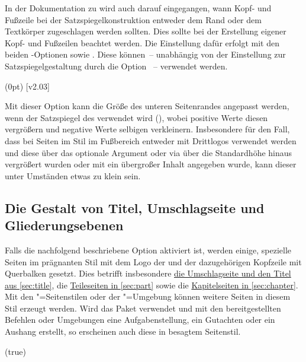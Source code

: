 \begin{DeclareEntity*}{}
\begin{DeclareEntity*}{}
\begin{DeclareEntity*}{}
In der Dokumentation zu  wird auch darauf eingegangen, wann 
Kopf- und Fußzeile bei der Satzspiegelkonstruktion entweder dem Rand oder dem 
Textkörper zugeschlagen werden sollten. Dies sollte bei der Erstellung eigener 
Kopf- und Fußzeilen beachtet werden. Die Einstellung dafür erfolgt mit den 
beiden \KOMAScript-Optionen 
 sowie 
. Diese 
können~-- unabhängig von der Einstellung zur Satzspiegelgestaltung durch die 
Option ~-- verwendet werden.
%

\begin{Declaration}
  {}
  (0pt)
  [v2.03]
\printdeclarationlist

Mit dieser Option kann die Größe des unteren Seitenrandes angepasst werden, 
wenn der Satzspiegel des \CDs verwendet wird (), 
wobei positive Werte diesen vergrößern und negative Werte selbigen verkleinern.
Insbesondere für den Fall, dass bei Seiten im Stil  
im Fußbereich entweder mit  Drittlogos verwendet werden und 
diese über das optionale Argument oder via  über die 
Standardhöhe hinaus vergrößert wurden oder mit  ein 
übergroßer Inhalt angegeben wurde, kann dieser unter Umständen etwas zu klein 
sein. 
\end{Declaration}



\subsection{%
  Die Gestalt von Titel, Umschlagseite und Gliederungsebenen%
}

Falls die nachfolgend beschriebene Option  aktiviert ist, 
werden einige, spezielle Seiten im prägnanten Stil mit dem Logo der \TnUD und 
der dazugehörigen Kopfzeile mit Querbalken gesetzt. Dies betrifft insbesondere 
\hyperref[sec:title]{die Umschlagseite und den Titel aus \autoref{sec:title}}, 
die \hyperref[sec:part]{Teileseiten in \autoref{sec:part}} sowie die
\hyperref[sec:chapter]{Kapitelseiten in \autoref{sec:chapter}}. Mit den 
"=Seitenstilen oder der "=Umgebung 
können weitere Seiten in diesem Stil erzeugt werden. Wird das Paket 
 verwendet und mit den bereitgestellten Befehlen oder 
Umgebungen eine Aufgabenstellung, ein Gutachten oder ein Aushang erstellt, so 
erscheinen auch diese in besagtem Seitenstil.
%
\begin{Declaration}
  {}
  (true)


\end{Declaration}
\end{DeclareEntity*}
\end{DeclareEntity*}
\end{DeclareEntity*}
